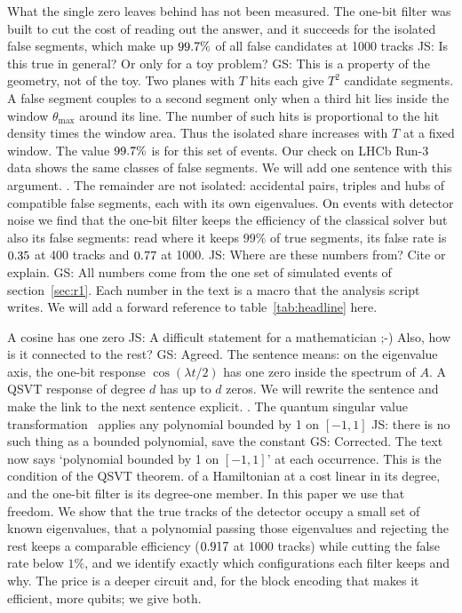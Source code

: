 \documentclass[11pt,a4paper]{article}
\newcommand{\js}[1]{{\color{blue} JS: #1 }}
\newcommand{\gs}[1]{{\color{orange!85!black} GS: #1 }}
\begin{document}
What the single zero leaves behind has not been measured. The one-bit filter was built to cut
the cost of reading out the answer, and it succeeds for the isolated false segments, which make
up $99.7\%$ of all false candidates at 1000 tracks \js{Is this true in general? Or only for a toy problem?} \gs{This is a property of the geometry, not of the toy. Two planes with $T$ hits each give $T^2$ candidate segments. A false segment couples to a second segment only when a third hit lies inside the window $\theta_{\max}$ around its line. The number of such hits is proportional to the hit density times the window area. Thus the isolated share increases with $T$ at a fixed window. The value $99.7\%$ is for this set of events. Our check on LHCb Run-3 data shows the same classes of false segments. We will add one sentence with this argument.}. The remainder are not isolated: accidental pairs,
triples and hubs of compatible false segments, each with its own eigenvalues. On events with
detector noise we find that the one-bit filter keeps the efficiency of the classical solver
but also its false segments: read where it keeps $99\%$ of true segments, its false rate is
$0.35$ at 400 tracks and $0.77$ at 1000. \js{Where are these numbers from? Cite or explain.} \gs{All numbers come from the one set of simulated events of section~\ref{sec:r1}. Each number in the text is a macro that the analysis script writes. We will add a forward reference to table~\ref{tab:headline} here.}

A cosine has one zero \js{A difficult statement for a mathematician ;-) Also, how is it connected to the rest?} \gs{Agreed. The sentence means: on the eigenvalue axis, the one-bit response $\cos(\lambda t/2)$ has one zero inside the spectrum of $A$. A QSVT response of degree $d$ has up to $d$ zeros. We will rewrite the sentence and make the link to the next sentence explicit.}. The quantum singular value
transformation~\cite{gslw2019,martyn2021} applies any polynomial bounded by 1 on $[-1,1]$ \js{there is no such thing as a bounded polynomial, save the constant} \gs{Corrected. The text now says `polynomial bounded by 1 on $[-1,1]$' at each occurrence. This is the condition of the QSVT theorem.} of a Hamiltonian at a
cost linear in its degree, and the one-bit filter is its degree-one member. In this paper we
use that freedom. We show that the true tracks of the detector occupy a small set of known
eigenvalues, that a polynomial passing those eigenvalues and rejecting the rest keeps a
comparable efficiency ($0.917$ at 1000 tracks) while cutting the false rate below
$1\%$, and we identify exactly which configurations each filter keeps and why. The price is a
deeper circuit and, for the block encoding that makes it efficient, more qubits; we give both.
\end{document}
